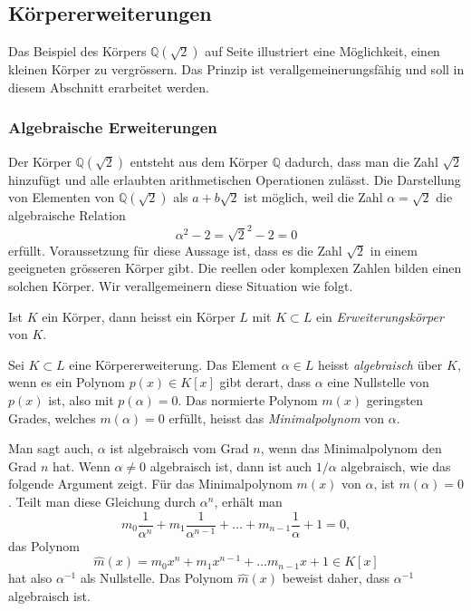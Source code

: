 %
%
%
\subsection{Körpererweiterungen
\label{buch:integral:subsection:koerpererweiterungen}}
Das Beispiel des Körpers $\mathbb{Q}(\!\sqrt{2})$ auf Seite
\pageref{buch:integral:beispiel:Qsqrt2} illustriert eine Möglichkeit,
einen kleinen Körper zu vergrössern.
Das Prinzip ist verallgemeinerungsfähig und soll in diesem Abschnitt
erarbeitet werden.

%
%
\subsubsection{Algebraische Erweiterungen}
Der Körper $\mathbb{Q}(\!\sqrt{2})$ entsteht aus dem Körper $\mathbb{Q}$
dadurch, dass man die Zahl $\sqrt{2}$ hinzufügt und alle erlaubten
arithmetischen Operationen zulässt.
Die Darstellung von Elementen von $\mathbb{Q}(\!\sqrt{2})$ als
$a+b\sqrt{2}$ ist möglich, weil die Zahl $\alpha=\sqrt{2}$ die 
algebraische Relation
\[
\alpha^2-2 = \sqrt{2}^2 -2 = 0
\]
erfüllt.
Voraussetzung für diese Aussage ist, dass es die Zahl $\sqrt{2}$ in einem
geeigneten grösseren Körper gibt. 
Die reellen oder komplexen Zahlen bilden einen solchen Körper.
Wir verallgemeinern diese Situation wie folgt.

\begin{definition}
Ist $K$ ein Körper, dann heisst ein Körper $L$ mit $K\subset L$ ein
{\em Erweiterungskörper} von $K$.
\end{definition}

\begin{definition}
\label{buch:integral:definition:algebraisch}
Sei $K\subset L$ eine Körpererweiterung.
Das Element $\alpha\in L$ heisst {\em algebraisch} über $K$, wenn es
ein Polynom $p(x)\in K[x]$ gibt derart, dass $\alpha$ eine Nullstelle
von $p(x)$ ist, also mit $p(\alpha)=0$.
Das normierte Polynom $m(x)$ geringsten Grades, welches $m(\alpha)=0$
erfüllt, heisst das {\em Minimalpolynom} von $\alpha$.
%
\end{definition}

Man sagt auch, $\alpha$ ist algebraisch vom Grad $n$, wenn das Minimalpolynom
den Grad $n$ hat.
Wenn $\alpha\ne 0$ algebraisch ist, dann ist auch $1/\alpha$ algebraisch,
wie das folgende Argument zeigt.
Für das Minimalpolynom $m(x)$ von $\alpha$, ist $m(\alpha)=0$.
Teilt man diese Gleichung durch $\alpha^n$, erhält man 
\[
m_0\frac{1}{\alpha^n}
+
m_1\frac{1}{\alpha^{n-1}}
+
\ldots
+
m_{n-1}\frac{1}{\alpha}
+
1
=
0,
\]
das Polynom
\[
\hat{m}(x)
=
m_0x^n + m_1x^{n-1} + \ldots m_{n-1} x + 1
\in
K[x]
\]
hat also $\alpha^{-1}$ als Nullstelle.
Das Polynom $\hat{m}(x)$ beweist daher, dass $\alpha^{-1}$ algebraisch ist.

